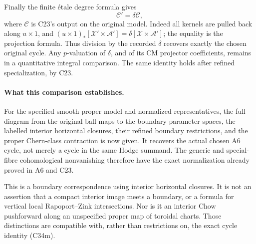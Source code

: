 Finally the finite \'etale degree
formula gives
\[
                          \mathcal C'=\delta\mathcal C,
                                                        \tag{C34m}
\]
where $\mathcal C$ is C23's output
on the original model. Indeed all
kernels are pulled back along
$u\times1$, and
$(u\times1)_*[\mathcal X'\times\mathcal A']
=\delta[\mathcal X\times\mathcal A']$;
the equality is the projection
formula. Thus division by the
recorded $\delta$ recovers exactly
the chosen original cycle. Any
$p$-valuation of $\delta$, and of
its CM projector coefficients,
remains in a quantitative integral
comparison. The same identity holds
after refined specialization, by
C23.

\paragraph{What this comparison establishes.}
For the specified smooth proper
model and normalized representatives,
the full diagram from the original
ball maps to the boundary parameter
spaces, the labelled interior
horizontal closures, their refined
boundary restrictions, and the
proper Chern-class contraction is
now given. It recovers the actual
chosen A6 cycle, not merely a cycle
in the same Hodge summand. The
generic and special-fibre
cohomological nonvanishing therefore
have the exact normalization already
proved in A6 and C23.

This is a boundary correspondence
using interior horizontal closures.
It is not an assertion that a
compact interior image meets a
boundary, or a formula for vertical
local Rapoport--Zink intersections.
Nor is it an interior Chow
pushforward along an unspecified
proper map of toroidal charts.
Those distinctions are compatible
with, rather than restrictions on,
the exact cycle identity (C34m).

